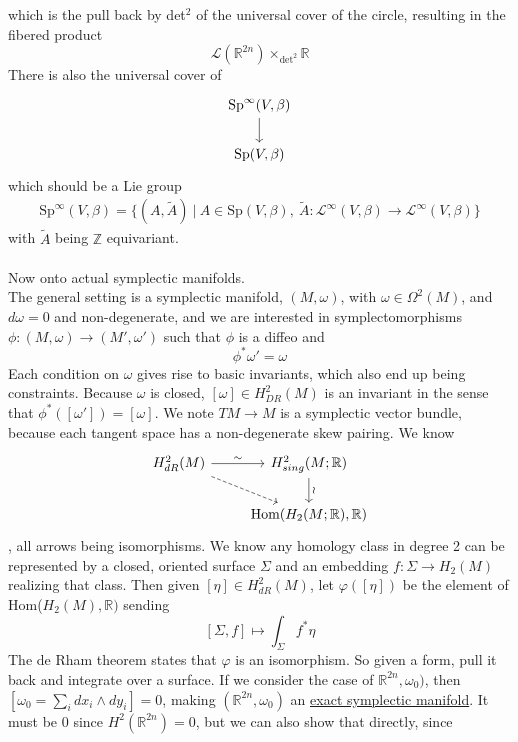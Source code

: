 \documentclass[12pt]{report}
\theoremstyle{definition}
\theoremstyle{remark}
\numberwithin{equation}{section}
\theoremstyle{definition}
\newcommand{\bb}[1]{\mathbb{#1}}
\renewcommand{\tilde}{\widetilde}
\begin{document}
which is the pull back by det$^2$ of the universal cover of the circle, resulting in the fibered product
$$
\mathcal{L}(\bb R^{2n}) \times_{\text{det}^2} \bb R
$$
There is also the universal cover of 
$$
\begin{tikzcd}
{\text{Sp}^\infty (V,\beta)} \arrow[d] \\
{\text{Sp}(V,\beta)}                  
\end{tikzcd}
$$
which should be a Lie group
\begin{gather*}
	\text{Sp}^\infty (V,\beta) = \big\{(A,\tilde A)\ |\ 	A \in \text{Sp}(V,\beta),\ 
	\tilde A : \mathcal{L}^\infty (V,\beta) \to \mathcal{L}^\infty (V,\beta)\big\}
\end{gather*}
with $\tilde A$ being $\bb Z$ equivariant. \\\\
Now onto actual symplectic manifolds. \\
The general setting is a symplectic manifold, $(M,\omega)$, with $\omega \in \Omega^2(M)$, and $d\omega =0 $ and non-degenerate, and we are interested in symplectomorphisms $\phi: (M,\omega) \to (M',\omega')$ such that $\phi$ is a diffeo and 
$$
	\phi^* \omega' = \omega
$$
Each condition on $\omega$ gives rise to basic invariants, which also end up being constraints. Because $\omega$ is closed, $[\omega] \in H^2_{DR}(M)$ is an invariant in the sense that $\phi^*([\omega']) = [\omega]$. We note $TM \to M$ is a symplectic vector bundle, because each tangent space has a non-degenerate skew pairing. We know 
$$
\begin{tikzcd}
H^2_{dR}(M) \arrow[r, "\sim"] \arrow[rd, dashed] & H^2_{sing}(M; \bb R) \arrow[d, "\wr"]     \\
                                         & {\text{Hom}(H_2(M; \bb R), \bb R)}
\end{tikzcd}
$$
, all arrows being isomorphisms. We know any homology class in degree 2 can be represented by a closed, oriented surface $\Sigma$ and an embedding $f: \Sigma \to H_2(M)$ realizing that class. Then given $[\eta] \in H^2_{dR}(M)$, let $\varphi([\eta])$ be the element of Hom($H_2(M), \bb R)$ sending 
$$
	[\Sigma, f] \mapsto \int_{\Sigma}f^* \eta
$$
The de Rham theorem states that $\varphi$ is an isomorphism. So given a form, pull it back and integrate over a surface. If we consider the case of $\bb R^{2n}, \omega_0)$, then $[\omega_0 = \sum_i dx_i \wedge dy_i] = 0$, making $(\bb R^{2n},\omega_0)$ an \underline{exact symplectic manifold}. It must be 0 since $H^2(\bb R^{2n}) = 0$, but we can also show that directly, since 
\end{document}
